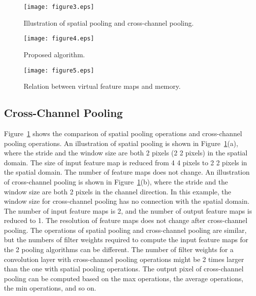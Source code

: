 \documentclass[10pt,twocolumn,letterpaper]{article}
\begin{document}
\begin{figure}[t]
\begin{center}
\texttt{[image: figure3.eps]}
\end{center}
   \caption{Illustration of spatial pooling and cross-channel pooling.}
\label{fig:pooling}
\end{figure}

\begin{figure*}[t]
\begin{center}
\texttt{[image: figure4.eps]}
\end{center}
   \caption{Proposed algorithm.}
\label{fig:flowchart}
\end{figure*}

\begin{figure*}[t]
\begin{center}
\texttt{[image: figure5.eps]}
\end{center}
   \caption{Relation between virtual feature maps and memory.}
\label{fig:relation}
\end{figure*}

\subsection{Cross-Channel Pooling}
\label{subsec:ccpooling}

Figure~\ref{fig:pooling} shows the comparison of spatial pooling operations and cross-channel pooling operations. An illustration of spatial pooling is shown in Figure~\ref{fig:pooling}(a), where the stride and the window size are both 2 pixels (2  2 pixels) in the spatial domain. The size of input feature map is reduced from 4  4 pixels to 2  2 pixels in the spatial domain. The number of feature maps does not change. An illustration of cross-channel pooling is shown in Figure~\ref{fig:pooling}(b), where the stride and the window size are both 2 pixels in the channel direction. In this example, the window size for cross-channel pooling has no connection with the spatial domain. The number of input feature maps is 2, and the number of output feature maps is reduced to 1. The resolution of feature maps does not change after cross-channel pooling. The operations of spatial pooling and cross-channel pooling are similar, but the numbers of filter weights required to compute the input feature maps for the 2 pooling algorithms can be different. The number of filter weights for a convolution layer with cross-channel pooling operations might be 2 times larger than the one with spatial pooling operations. The output pixel of cross-channel pooling can be computed based on the max operations, the average operations, the min operations, and so on.
\end{document}
